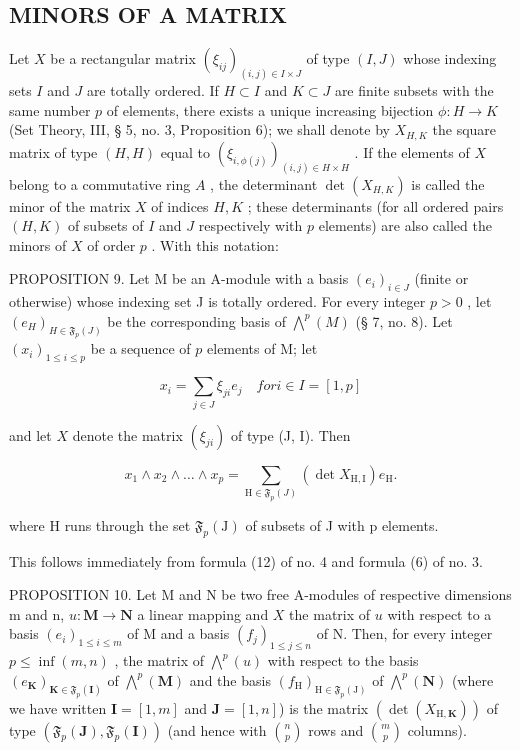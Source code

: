 \subsection{MINORS OF A MATRIX}

Let \(X\) be a rectangular matrix \((\xi_{ij})_{(i,j)\in I\times J}\) of type \((I,J)\) whose indexing sets \(I\) and \(J\) are totally ordered. If \(H\subset I\) and \(K\subset J\) are finite subsets with the same number \(p\) of elements, there exists a unique increasing bijection \(\phi :H\to K\) (Set Theory, III, § 5, no. 3, Proposition 6); we shall denote by \(X_{H,K}\) the square matrix of type \((H,H)\) equal to \((\xi_{i,\phi (j)})_{(i,j)\in H\times H}\) . If the elements of \(X\) belong to a commutative ring \(A\) , the determinant \(\det (X_{H,K})\) is called the minor of the matrix \(X\) of indices \(H,K\) ; these determinants (for all ordered pairs \((H,K)\) of subsets of \(I\) and \(J\) respectively with \(p\) elements) are also called the minors of \(X\) of order \(p\) . With this notation:

PROPOSITION 9. Let M be an A-module with a basis \((e_i)_{i \in J}\) (finite or otherwise) whose indexing set J is totally ordered. For every integer \(p > 0\) , let \((e_H)_{H \in \mathfrak{F}_p(J)}\) be the corresponding basis of \(\bigwedge^p(M)\) (§ 7, no. 8). Let \((x_i)_{1 \leqslant i \leqslant p}\) be a sequence of \(p\) elements of M; let

\[
x _ {i} = \sum_ {j \in J} \xi_ {j i} e _ {j} \quad for i \in I = [1, p]
\]

and let \(X\) denote the matrix \((\xi_{ji})\) of type (J, I). Then

\[
x _ {1} \wedge x _ {2} \wedge \dots \wedge x _ {p} = \sum_ {\mathrm{H} \in \mathfrak {F} _ {p} (J)} (\det X _ {\mathrm{H,I}}) e _ {\mathrm{H}}.\tag{17}
\]

where H runs through the set \(\mathfrak{F}_{p}(\mathrm{J})\) of subsets of J with p elements.

This follows immediately from formula (12) of no. 4 and formula (6) of no. 3.

PROPOSITION 10. Let M and N be two free A-modules of respective dimensions m and n, \(u: \mathbf{M} \to \mathbf{N}\) a linear mapping and \(X\) the matrix of \(u\) with respect to a basis \((e_i)_{1 \leqslant i \leqslant m}\) of M and a basis \((f_j)_{1 \leqslant j \leqslant n}\) of N. Then, for every integer \(p \leqslant \inf(m, n)\) , the matrix of \(\bigwedge^p(u)\) with respect to the basis \((e_{\mathbf{K}})_{\mathbf{K} \in \mathfrak{F}_p(\mathbf{I})}\) of \(\bigwedge^p(\mathbf{M})\) and the basis \((f_{\mathrm{H}})_{\mathrm{H} \in \mathfrak{F}_p(\mathrm{J})}\) of \(\bigwedge^p(\mathbf{N})\) (where we have written \(\mathbf{I} = [1, m]\) and \(\mathbf{J} = [1, n]\)) is the matrix \((\det(X_{\mathrm{H},\mathbf{K}}))\) of type \((\mathfrak{F}_p(\mathbf{J}), \mathfrak{F}_p(\mathbf{I}))\) (and hence with \(\binom{n}{p}\) rows and \(\binom{m}{p}\) columns).

